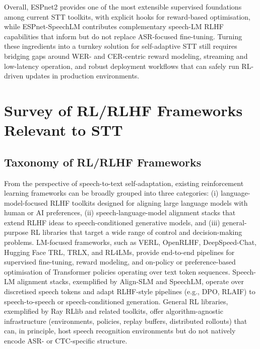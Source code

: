 \documentclass[conference]{IEEEtran}
\begin{document}
Overall, ESPnet2 provides one of the most extensible supervised foundations among current STT toolkits, with explicit hooks for reward-based optimisation, while ESPnet-SpeechLM contributes complementary speech-LM RLHF capabilities that inform but do not replace ASR-focused fine-tuning.
Turning these ingredients into a turnkey solution for self-adaptive STT still requires bridging gaps around WER- and CER-centric reward modeling, streaming and low-latency operation, and robust deployment workflows that can safely run RL-driven updates in production environments.

\section{Survey of RL/RLHF Frameworks Relevant to STT}
%
%
\label{sec:rl-frameworks}

\subsection{Taxonomy of RL/RLHF Frameworks}

From the perspective of speech-to-text self-adaptation, existing reinforcement learning frameworks can be broadly grouped into three categories: (i) language-model-focused RLHF toolkits designed for aligning large language models with human or AI preferences, (ii) speech-language-model alignment stacks that extend RLHF ideas to speech-conditioned generative models, and (iii) general-purpose RL libraries that target a wide range of control and decision-making problems.
LM-focused frameworks, such as VERL, OpenRLHF, DeepSpeed-Chat, Hugging Face TRL, TRLX, and RL4LMs, provide end-to-end pipelines for supervised fine-tuning, reward modeling, and on-policy or preference-based optimisation of Transformer policies operating over text token sequences.
Speech-LM alignment stacks, exemplified by Align-SLM and SpeechLM, operate over discretised speech tokens and adapt RLHF-style pipelines (e.g., DPO, RLAIF) to speech-to-speech or speech-conditioned generation.
General RL libraries, exemplified by Ray RLlib and related toolkits, offer algorithm-agnostic infrastructure (environments, policies, replay buffers, distributed rollouts) that can, in principle, host speech recognition environments but do not natively encode ASR- or CTC-specific structure.
\end{document}
